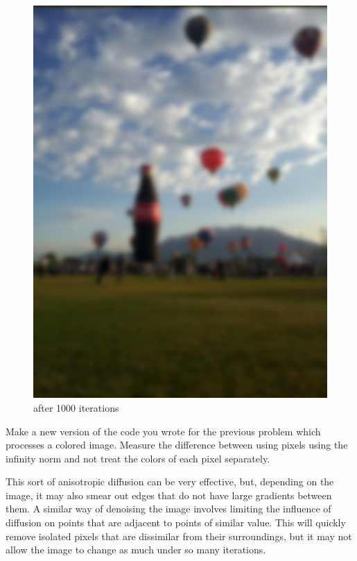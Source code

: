 \begin{figure}[ht]
\begin{minipage}[b]{0.45\linewidth}
\includegraphics[width=\textwidth]{baloon_col1000}
\caption*{after 1000 iterations}
\end{minipage}
\end{figure}
\vfill
\clearpage

\begin{problem}
Make a new version of the code you wrote for the previous problem which processes a colored image.
Measure the difference between using pixels using the infinity norm and not treat the colors of each pixel separately.
\end{problem}

This sort of anisotropic diffusion can be very effective, but, depending on the image, it may also smear out edges that do not have large gradients between them.
A similar way of denoising the image involves limiting the influence of diffusion on points that are adjacent to points of similar value.
This will quickly remove isolated pixels that are dissimilar from their surroundings, but it may not allow the image to change as much under so many iterations.

